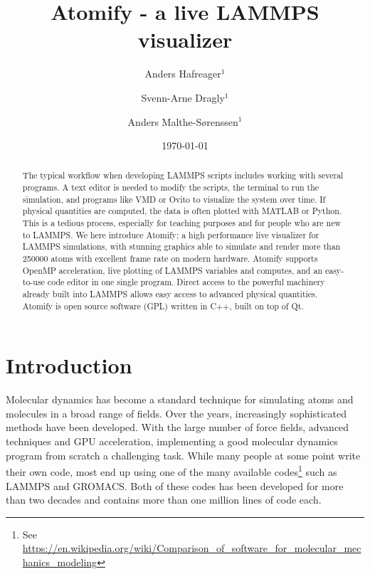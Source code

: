\documentclass[aps,pre,twocolumn,letterpaper,floatfix]{revtex4}
\begin{document}
\title{Atomify - a live LAMMPS visualizer}
\author{Anders Hafreager$^1$}
\author{Svenn-Arne Dragly$^{1}$} 
\author{Anders Malthe-S\o renssen$^1$}
\date{\today} 

\begin{abstract} 
The typical workflow when developing LAMMPS scripts includes working with several programs. A text editor is needed to modify the scripts, the terminal to run the simulation, and programs like VMD or Ovito to visualize the system over time. If physical quantities are computed, the data is often plotted with MATLAB or Python. This is a tedious process, especially for teaching purposes and for people who are new to LAMMPS. 
We here introduce Atomify; a high performance live visualizer for LAMMPS simulations, with stunning graphics able to simulate and render more than 250000 atoms with excellent frame rate on modern hardware. Atomify supports OpenMP acceleration, live plotting of LAMMPS variables and computes, and an easy-to-use code editor in one single program. Direct access to the powerful machinery already built into LAMMPS allows easy access to advanced physical quantities. Atomify is open source software (GPL) written in C++, built on top of Qt. 
\end{abstract} 
 
\maketitle
 
\section{Introduction}
Molecular dynamics has become a standard technique for simulating atoms and molecules in a broad range of fields. Over the years, increasingly sophisticated methods have been developed. With the large number of force fields, advanced techniques and GPU acceleration, implementing a good molecular dynamics program from scratch a challenging task. While many people at some point write their own code, most end up using one of the many available codes\footnote{See \url{https://en.wikipedia.org/wiki/Comparison_of_software_for_molecular_mechanics_modeling}} such as LAMMPS\cite{plimpton1995fast} and GROMACS\cite{Pronk2013}. Both of these codes has been developed for more than two decades and contains more than one million lines of code each. 
\end{document}
